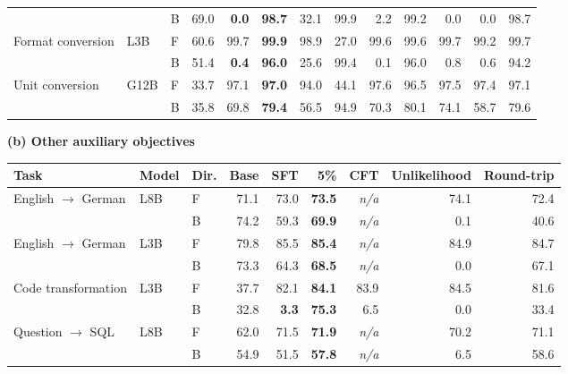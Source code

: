 \begin{table}[!t]
\begin{tabular}{lllrrrrrrrrrr}
 &  & B & 69.0 & \textcolor{red!70!black}{\textbf{0.0}} & \textcolor{blue!60!black}{\textbf{98.7}} & 32.1 & 99.9 & 2.2 & 99.2 & 0.0 & 0.0 & 98.7 \\
\addlinespace[2pt]
Format conversion & L3B & F & 60.6 & 99.7 & \textcolor{blue!60!black}{\textbf{99.9}} & 98.9 & 27.0 & 99.6 & 99.6 & 99.7 & 99.2 & 99.7 \\
 &  & B & 51.4 & \textcolor{red!70!black}{\textbf{0.4}} & \textcolor{blue!60!black}{\textbf{96.0}} & 25.6 & 99.4 & 0.1 & 96.0 & 0.8 & 0.6 & 94.2 \\
\addlinespace[2pt]
Unit conversion & G12B & F & 33.7 & 97.1 & \textcolor{blue!60!black}{\textbf{97.0}} & 94.0 & 44.1 & 97.6 & 96.5 & 97.5 & 97.4 & 97.1 \\
 &  & B & 35.8 & 69.8 & \textcolor{blue!60!black}{\textbf{79.4}} & 56.5 & 94.9 & 70.3 & 80.1 & 74.1 & 58.7 & 79.6 \\
\bottomrule
\end{tabular}
\par\medskip\textbf{(b) Other auxiliary objectives}\par\smallskip
\setlength{\tabcolsep}{3pt}
\begin{tabular}{lllrrrrrr}
\toprule
Task & Model & Dir. & Base & SFT & 5\% & CFT & Unlikelihood & Round-trip \\
\midrule
English $\to$ German & L8B & F & 71.1 & 73.0 & \textcolor{blue!60!black}{\textbf{73.5}} & \textit{n/a} & 74.1 & 72.4 \\
 &  & B & 74.2 & 59.3 & \textcolor{blue!60!black}{\textbf{69.9}} & \textit{n/a} & 0.1 & 40.6 \\
\addlinespace[2pt]
English $\to$ German & L3B & F & 79.8 & 85.5 & \textcolor{blue!60!black}{\textbf{85.4}} & \textit{n/a} & 84.9 & 84.7 \\
 &  & B & 73.3 & 64.3 & \textcolor{blue!60!black}{\textbf{68.5}} & \textit{n/a} & 0.0 & 67.1 \\
\addlinespace[2pt]
Code transformation & L3B & F & 37.7 & 82.1 & \textcolor{blue!60!black}{\textbf{84.1}} & 83.9 & 84.5 & 81.6 \\
 &  & B & 32.8 & \textcolor{red!70!black}{\textbf{3.3}} & \textcolor{blue!60!black}{\textbf{75.3}} & 6.5 & 0.0 & 33.4 \\
\addlinespace[2pt]
Question $\to$ SQL & L8B & F & 62.0 & 71.5 & \textcolor{blue!60!black}{\textbf{71.9}} & \textit{n/a} & 70.2 & 71.1 \\
 &  & B & 54.9 & 51.5 & \textcolor{blue!60!black}{\textbf{57.8}} & \textit{n/a} & 6.5 & 58.6 \\

\end{tabular}
\end{table}
